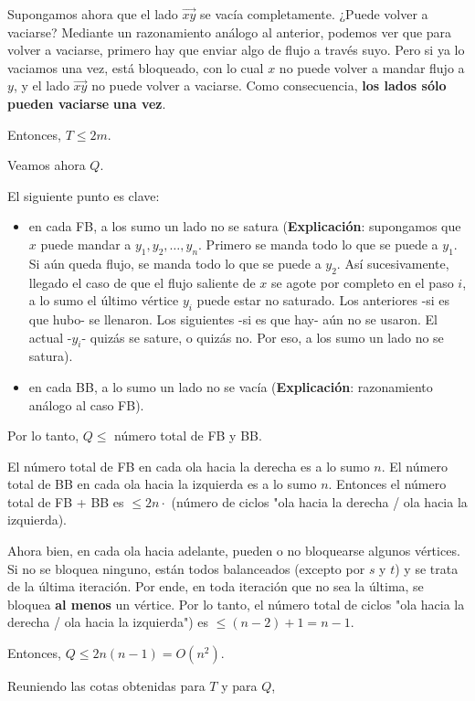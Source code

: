 \documentclass[10pt,a4paper]{article}
\begin{document}
Supongamos ahora que el lado $\overrightarrow{xy}$ se vacía completamente. ¿Puede volver a vaciarse? Mediante un razonamiento análogo al anterior, podemos ver que para volver a vaciarse, primero hay que enviar algo de flujo a través suyo. Pero si ya lo vaciamos una vez, está bloqueado, con lo cual $x$ no puede volver a mandar flujo a $y$, y el lado $\overrightarrow{xy}$ no puede volver a vaciarse. Como consecuencia, \textbf{los lados sólo pueden vaciarse} \textbf{una vez}.

Entonces, $T \leq 2m$.

Veamos ahora $Q$.

El siguiente punto es clave:

\begin{itemize}

	\item en cada FB, a los sumo un lado no se satura (\textbf{Explicación}: supongamos que $x$ puede mandar a $y_1, y_2, \dots, y_n$. Primero se manda todo lo que se puede a $y_1$. Si aún queda flujo, se manda todo lo que se puede a $y_2$. Así sucesivamente, llegado el caso de que el flujo saliente de $x$ se agote por completo en el paso $i$, a lo sumo el último vértice $y_i$ puede estar no saturado. Los anteriores -si es que hubo- se llenaron. Los siguientes -si es que hay- aún no se usaron. El actual -$y_i$- quizás se sature, o quizás no. Por eso, a los sumo un lado no se satura).
	\item en cada BB, a lo sumo un lado no se vacía (\textbf{Explicación}: razonamiento análogo al caso FB).
\end{itemize}

Por lo tanto, $Q \leq $ número total de FB y BB.

El número total de FB en cada ola hacia la derecha es a lo sumo $n$. El número total de BB en cada ola hacia la izquierda es a lo sumo $n$. Entonces el número total de FB + BB es $\leq 2n \cdot$ (número de ciclos "ola hacia la derecha / ola hacia la izquierda).

Ahora bien, en cada ola hacia adelante, pueden o no bloquearse algunos vértices. Si no se bloquea ninguno, están todos balanceados (excepto por $s$ y $t$) y se trata de la última iteración. Por ende, en toda iteración que no sea la última, se bloquea \textbf{al menos} un vértice. Por lo tanto, el número total de ciclos "ola hacia la derecha / ola hacia la izquierda") es $\leq (n-2) + 1 = n - 1$.

Entonces, $Q \leq 2n(n-1) = O (n^2)$.

Reuniendo las cotas obtenidas para $T$ y para $Q$,
\end{document}
